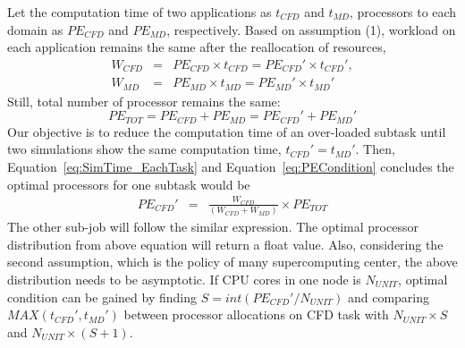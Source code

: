 \documentclass[conference,final]{IEEEtran}
\begin{document}
Let the computation time of two applications as $t_{CFD}$ and $t_{MD}$, processors to each domain as $PE_{CFD}$ and $PE_{MD}$, respectively. Based on assumption (1), workload on each application remains the same after the reallocation of resources,
\begin{eqnarray}
W_{CFD} &=& PE_{CFD} \times t_{CFD} = PE_{CFD}' \times t_{CFD}', \nonumber \\
W_{MD} &=& PE_{MD} \times t_{MD} = PE_{MD}' \times t_{MD}'
\label{eq:SimTime_EachTask}
\end{eqnarray}
Still, total number of processor remains the same:
\begin{equation}
PE_{TOT} = PE_{CFD} + PE_{MD} = PE_{CFD}' + PE_{MD}'
\label{eq:PECondition}
\end{equation}
Our objective is to reduce the computation time of an over-loaded subtask until two simulations show the same computation time, $t_{CFD}' = t_{MD}'$. Then, Equation~\ref{eq:SimTime_EachTask} and Equation~\ref{eq:PECondition} concludes the optimal processors for one subtask would be
\begin{eqnarray}
PE_{CFD}' & = & \frac {W_{CFD}} {(W_{CFD} + W_{MD})} \times PE_{TOT}
\end{eqnarray}
The other sub-job will follow the similar expression.
The optimal processor distribution from above equation will return a float value. Also, considering the second assumption, which is the policy of many supercomputing center, the above distribution needs to be asymptotic. If CPU cores in one node is $N_{UNIT}$,
optimal condition can be gained by finding $S = int(PE_{CFD}' / N_{UNIT})$ and comparing $MAX(t_{CFD}',t_{MD}')$ between processor allocations on CFD task with $N_{UNIT} \times S$ and $N_{UNIT} \times (S+1)$.



\end{document}
